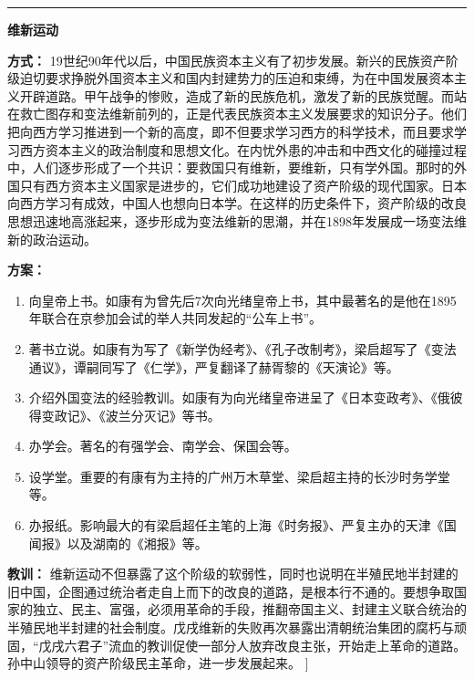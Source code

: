 \begin{enumerate}
		\bigskip
		\hrule
		\bigskip
		{\begin{center}\textbf{维新运动}\end{center}}\par
			\textbf{方式：}  19世纪90年代以后，中国民族资本主义有了初步发展。新兴的民族资产阶级迫切要求挣脱外国资本主义和国内封建势力的压迫和束缚，为在中国发展资本主义开辟道路。甲午战争的惨败，造成了新的民族危机，激发了新的民族觉醒。而站在救亡图存和变法维新前列的，正是代表民族资本主义发展要求的知识分子。他们把向西方学习推进到一个新的高度，即不但要求学习西方的科学技术，而且要求学习西方资本主义的政治制度和思想文化。在内忧外患的冲击和中西文化的碰撞过程中，人们逐步形成了一个共识：要救国只有维新，要维新，只有学外国。那时的外国只有西方资本主义国家是进步的，它们成功地建设了资产阶级的现代国家。日本向西方学习有成效，中国人也想向日本学。在这样的历史条件下，资产阶级的改良思想迅速地高涨起来，逐步形成为变法维新的思潮，并在1898年发展成一场变法维新的政治运动。\par
			\textbf{方案：} \begin{enumerate}
				\item 向皇帝上书。如康有为曾先后7次向光绪皇帝上书，其中最著名的是他在1895年联合在京参加会试的举人共同发起的“公车上书”。
				\item 著书立说。如康有为写了《新学伪经考》、《孔子改制考》，梁启超写了《变法通议》，谭嗣同写了《仁学》，严复翻译了赫胥黎的《天演论》等。
				\item 介绍外国变法的经验教训。如康有为向光绪皇帝进呈了《日本变政考》、《俄彼得变政记》、《波兰分灭记》等书。
				\item 办学会。著名的有强学会、南学会、保国会等。
				\item 设学堂。重要的有康有为主持的广州万木草堂、梁启超主持的长沙时务学堂等。
				\item 办报纸。影响最大的有梁启超任主笔的上海《时务报》、严复主办的天津《国闻报》以及湖南的《湘报》等。\end{enumerate} \par
			\textbf{教训：} 维新运动不但暴露了这个阶级的软弱性，同时也说明在半殖民地半封建的旧中国，企图通过统治者走自上而下的改良的道路，是根本行不通的。要想争取国家的独立、民主、富强，必须用革命的手段，推翻帝国主义、封建主义联合统治的半殖民地半封建的社会制度。戊戌维新的失败再次暴露出清朝统治集团的腐朽与顽固，“戊戌六君子”流血的教训促使一部分人放弃改良主张，开始走上革命的道路。孙中山领导的资产阶级民主革命，进一步发展起来。
	]
	
	\question[试述近代以来中国人学习西方的努力屡遭失败的原因。]
	

\end{enumerate}
